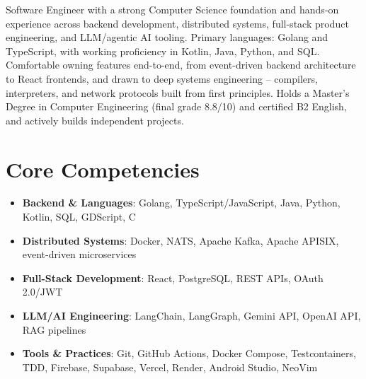 \documentclass[11pt,a4paper,sans]{moderncv}
\begin{document}
\makecvtitle


\vspace{6pt}
\small{Software Engineer with a strong Computer Science foundation and hands-on experience across backend development, distributed systems, full-stack product engineering, and LLM/agentic AI tooling. Primary languages: Golang and TypeScript, with working proficiency in Kotlin, Java, Python, and SQL. Comfortable owning features end-to-end, from event-driven backend architecture to React frontends, and drawn to deep systems engineering -- compilers, interpreters, and network protocols built from first principles. Holds a Master's Degree in Computer Engineering (final grade 8.8/10) and certified B2 English, and actively builds independent projects.}


\section{Core Competencies}
\vspace{1pt}
\begin{itemize}

\item \textbf{Backend \& Languages}: Golang, TypeScript/JavaScript, Java, Python, Kotlin, SQL, GDScript, C

\item \textbf{Distributed Systems}: Docker, NATS, Apache Kafka, Apache APISIX, event-driven microservices

\item \textbf{Full-Stack Development}: React, PostgreSQL, REST APIs, OAuth 2.0/JWT

\item \textbf{LLM/AI Engineering}: LangChain, LangGraph, Gemini API, OpenAI API, RAG pipelines

\item \textbf{Tools \& Practices}: Git, GitHub Actions, Docker Compose, Testcontainers, TDD, Firebase, Supabase, Vercel, Render, Android Studio, NeoVim

\end{itemize}

\end{document}

